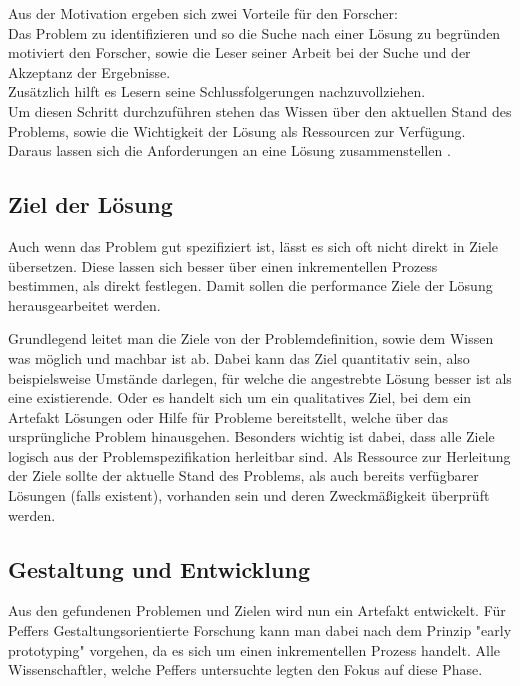 Aus der Motivation ergeben sich zwei Vorteile für den Forscher: \\
Das Problem zu identifizieren und so die Suche nach einer Lösung zu begründen motiviert den Forscher, sowie die Leser seiner Arbeit bei der Suche und der Akzeptanz der Ergebnisse. \\
Zusätzlich hilft es Lesern seine Schlussfolgerungen nachzuvollziehen. \\
Um diesen Schritt durchzuführen stehen das Wissen über den aktuellen Stand des Problems, sowie die Wichtigkeit der Lösung als Ressourcen zur Verfügung. Daraus lassen sich die Anforderungen an eine Lösung zusammenstellen \cite{peffers_design_2007}.

\subsection{Ziel der Lösung}

Auch wenn das Problem gut spezifiziert ist, lässt es sich oft nicht direkt in Ziele übersetzen. Diese lassen sich besser über einen inkrementellen Prozess bestimmen, als direkt festlegen. Damit sollen die performance Ziele der Lösung herausgearbeitet werden. 

Grundlegend leitet man die Ziele von der Problemdefinition, sowie dem Wissen was möglich und machbar ist ab. Dabei kann das Ziel quantitativ sein, also beispielsweise Umstände darlegen, für welche die angestrebte Lösung besser ist als eine existierende. Oder es handelt sich um ein qualitatives Ziel, bei dem ein Artefakt Lösungen oder Hilfe für Probleme bereitstellt, welche über das ursprüngliche Problem hinausgehen. Besonders wichtig ist dabei, dass alle Ziele logisch aus der Problemspezifikation herleitbar sind. Als Ressource zur Herleitung der Ziele sollte der aktuelle Stand des Problems, als auch bereits verfügbarer Lösungen (falls existent), vorhanden sein und deren Zweckmäßigkeit überprüft werden.

\subsection{Gestaltung und Entwicklung}

Aus den gefundenen Problemen und Zielen wird nun ein Artefakt entwickelt. Für Peffers Gestaltungsorientierte Forschung kann man dabei nach dem Prinzip "early prototyping" vorgehen, da es sich um einen inkrementellen Prozess handelt. Alle Wissenschaftler, welche Peffers untersuchte legten den Fokus auf diese Phase.

